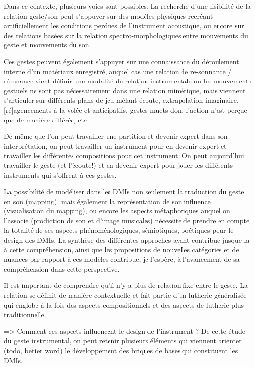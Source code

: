 Dans ce contexte, plusieurs voies sont possibles. 
La recherche d'une lisibilité de la relation geste/son peut s'appuyer sur des modèles physiques recréant artificiellement les conditions perdues de l'instrument acoustique, ou encore sur des relations basées sur la relation spectro-morphologiques entre mouvements du geste et mouvements du son.

Ces gestes peuvent également s'appuyer sur une connaissance du déroulement interne d'un matériaux enregistré, auquel cas une relation de re-sonnance / résonance vient définir une modalité de relation instrumentale ou les mouvements gestuels ne sont pas nécessairement dans une relation mimétique, mais viennent s'articuler sur différents plans de jeu mêlant écoute, extrapolation imaginaire, [ré]agencements à la volée et anticipatifs, gestes muets dont l'action n'est perçue que de manière différée, etc.


De même que l'on peut travailler une partition et devenir expert dans son interprétation, on peut travailler un instrument pour en devenir expert et travailler les différentes compositions pour cet instrument. On peut aujourd'hui travailler le geste (et l'écoute!) et en devenir expert pour jouer les différents instruments qui s'offrent à ces gestes.


La possibilité de modéliser dans les \glspl{DMI} non seulement la traduction du geste en son (mapping), mais également la représentation de son influence (visualisation du mapping), ou encore les aspects métaphoriques auquel on l'associe (prodiction de son et d'image musicales) nécessite de prendre en compte la totalité de ses aspects phénoménologiques, sémiotiques, poétiques pour le design des \glspl{DMI}. 
\indent La synthèse des différentes approches ayant contribué jusque la à cette compréhension, ainsi que les propositions de nouvelles catégories et de nuances par rapport à ces modèles contribue, je l'espère, à l'avancement de sa compréhension dans cette perspective.


Il est important de comprendre qu'il n'y a plus de relation fixe entre le geste. La relation se définit de manière contextuelle et fait partie d'un lutherie généralisée qui englobe à la fois des aspects compositionnels et des aspects de lutherie plus traditionnelle.


=> Comment ces aspects influencent le design de l’instrument ?
De cette étude du geste instrumental, on peut retenir plusieurs éléments qui viennent orienter (todo, better word) le développement des briques de bases qui constituent les \glspl{DMI}.

